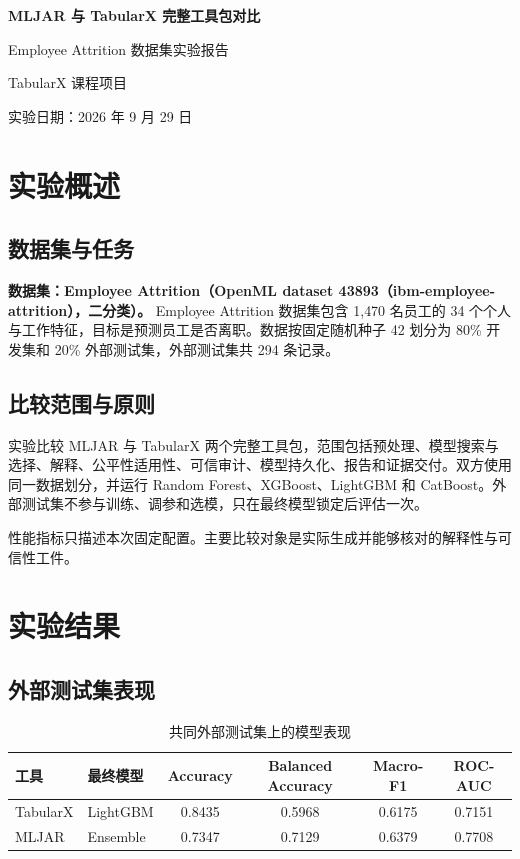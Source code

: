 \documentclass[degree=bachelor,language=chinese,fontset=fandol]{thuthesis}
\begin{document}
\begin{titlepage}
  \centering
  \vspace*{2.3cm}
  {\bfseries MLJAR 与 TabularX 完整工具包对比\par}
  \vspace{1.2cm}
  {Employee Attrition 数据集实验报告\par}
  \vspace{2.2cm}
  {TabularX 课程项目\par}
  \vfill
  {实验日期：2026 年 9 月 29 日\par}
  \vspace{1.2cm}
\end{titlepage}

\frontmatter
\tableofcontents
\mainmatter
\chapter{实验概述}
\section{数据集与任务}
\textbf{数据集：Employee Attrition（OpenML dataset 43893（ibm-employee-attrition），二分类）。}
Employee Attrition 数据集包含 1,470 名员工的 34 个个人与工作特征，目标是预测员工是否离职。数据按固定随机种子 42 划分为 80\% 开发集和 20\% 外部测试集，外部测试集共 294 条记录。

\section{比较范围与原则}
实验比较 MLJAR 与 TabularX 两个完整工具包，范围包括预处理、模型搜索与选择、解释、公平性适用性、可信审计、模型持久化、报告和证据交付。双方使用同一数据划分，并运行 Random Forest、XGBoost、LightGBM 和 CatBoost。外部测试集不参与训练、调参和选模，只在最终模型锁定后评估一次。

性能指标只描述本次固定配置。主要比较对象是实际生成并能够核对的解释性与可信性工件。

\chapter{实验结果}
\section{外部测试集表现}
\begin{table}[htbp]
  \centering
  \small
  \caption{共同外部测试集上的模型表现}
  \begin{tabular}{llcccc}
    \toprule
    工具 & 最终模型 & Accuracy & Balanced Accuracy & Macro-F1 & ROC-AUC \\
    \midrule
    TabularX & LightGBM & 0.8435 & 0.5968 & 0.6175 & 0.7151 \\
    MLJAR & Ensemble & 0.7347 & 0.7129 & 0.6379 & 0.7708 \\
    \bottomrule
  \end{tabular}
\end{table}
\end{document}
